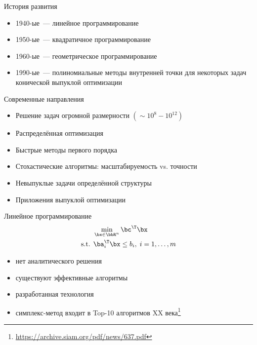 \documentclass[12pt]{beamer}
\begin{document}
\begin{frame}{История развития}

\begin{itemize}
\item 1940-ые~--- линейное программирование
\item 1950-ые~--- квадратичное программирование
\item 1960-ые~--- геометрическое программирование
\item 1990-ые~--- полиномиальные методы внутренней точки для некоторых задач конической выпуклой оптимизации
\end{itemize}
\end{frame}

\begin{frame}{Современные направления}
\begin{itemize}[<+->]
\item Решение задач огромной размерности $(\sim 10^8-10^{12})$
\item Распределённая оптимизация
\item Быстрые методы первого порядка
\item Стохастические алгоритмы: масштабируемость vs. точности
\item Невыпуклые задачи определённой структуры
\item Приложения выпуклой оптимизации
\end{itemize}
\end{frame}

\begin{frame}{Линейное программирование}
\begin{equation*}
\begin{split}
&\min\limits_{\bx \in \bbR^n} \bc^{\T}\bx\\
\text{s.t. } & \ba^{\T}_i \bx \leq b_i, \; i = 1,\ldots, m
\end{split}
\label{eq::lin_prog}
\end{equation*}
\begin{itemize}
\item нет аналитического решения
\item существуют эффективные алгоритмы
\item разработанная технология
\item симплекс-метод входит в Top-10 алгоритмов XX века\footnote{\url{https://archive.siam.org/pdf/news/637.pdf}}
\end{itemize}
\end{frame}
\end{document}
